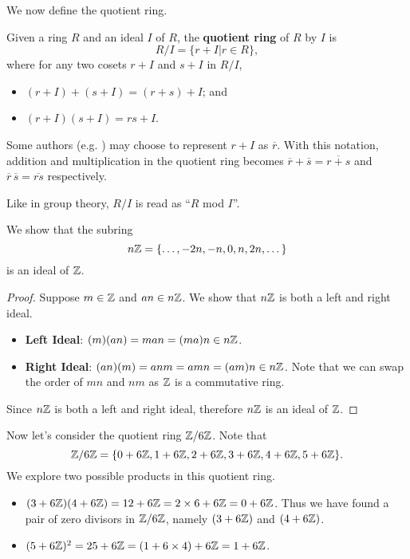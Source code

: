 We now define the quotient ring.
\begin{definition}
    Given a ring $R$ and an ideal $I$ of $R$, the \textbf{quotient ring} of $R$ by $I$ is
    \[
        R/I = \{r + I \vert r \in R\},
    \]
    where for any two cosets $r+I$ and $s+I$ in $R/I$,
    \begin{itemize}
        \item $(r+I) + (s+I) = (r+s)+I$; and
        \item $(r+I)(s+I) = rs+I$.
    \end{itemize}
\end{definition}
\begin{remark}
    Some authors (e.g. \cite[p.~243]{dummit_foote_2004}) may choose to represent $r + I$ as $\overline{r}$. With this notation, addition and multiplication in the quotient ring becomes $\overline{r}+\overline{s} = \overline{r+s}$ and $\overline{r}\,\overline{s} = \overline{rs}$ respectively.
\end{remark}
\begin{remark}
    Like in group theory, $R/I$ is read as ``$R$ mod $I$''.
\end{remark}
\begin{example}
    We show that the subring
    \[
        n\mathbb{Z} = \{\dots, -2n, -n, 0, n, 2n, \dots\}
    \]
    is an ideal of $\mathbb{Z}$.
    \begin{proof}
        Suppose $m \in \mathbb{Z}$ and $an \in n\mathbb{Z}$. We show that $n\mathbb{Z}$ is both a left and right ideal.
        \begin{itemize}
            \item \textbf{Left Ideal}: $(m)(an) = man = (ma)n \in n\mathbb{Z}$.
            \item \textbf{Right Ideal}: $(an)(m) = anm = amn = (am)n \in n\mathbb{Z}$. Note that we can swap the order of $mn$ and $nm$ as $\mathbb{Z}$ is a commutative ring.
        \end{itemize}
        Since $n\mathbb{Z}$ is both a left and right ideal, therefore $n\mathbb{Z}$ is an ideal of $\mathbb{Z}$.
    \end{proof}

    Now let's consider the quotient ring $\mathbb{Z}/6\mathbb{Z}$. Note that
    \[
        \mathbb{Z}/6\mathbb{Z} = \{0 + 6\mathbb{Z}, 1+6\mathbb{Z}, 2+6\mathbb{Z}, 3+6\mathbb{Z}, 4+6\mathbb{Z}, 5+6\mathbb{Z}\}.
    \]
    We explore two possible products in this quotient ring.
    \begin{itemize}
        \item $(3+6\mathbb{Z})(4+6\mathbb{Z}) = 12+6\mathbb{Z} = 2\times 6 + 6\mathbb{Z} = 0 + 6\mathbb{Z}$. Thus we have found a pair of zero divisors in $\mathbb{Z}/6\mathbb{Z}$, namely $(3+6\mathbb{Z})$ and $(4+6\mathbb{Z})$.
        \item $(5+6\mathbb{Z})^2 = 25+6\mathbb{Z} = (1 + 6\times4) + 6\mathbb{Z} = 1 + 6\mathbb{Z}$.
    \end{itemize}
\end{example}
